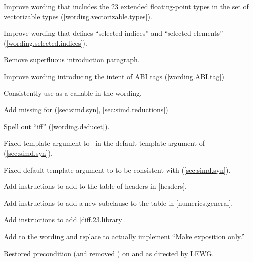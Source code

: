 \begin{revision}
\item Improve wording that includes the \CC{}23 extended floating-point types in the set of vectorizable types (\ref{wording.vectorizable.types}).
\item Improve wording that defines “selected indices” and “selected elements” (\ref{wording.selected.indices}).
\item Remove superfluous introduction paragraph.
\item Improve wording introducing the intent of ABI tags (\ref{wording.ABI.tag})
\item Consistently use  as a callable in the wording.
\item Add missing  for  (\ref{sec:simd.syn}, \ref{sec:simd.reductions}).
\item Spell out “iff” (\ref{wording.deducet}).
\item Fixed template argument to \nativeabi\ in the default template argument of  (\ref{sec:simd.syn}).
\item Fixed default template argument to  to be consistent with  (\ref{sec:simd.syn}).
\item Add instructions to add  to the table of headers in [headers].
\item Add instructions to add a new subclause to the table in [numerics.general].
\item Add instructions to add  [diff.23.library].
\item Add \simdsizev to the wording and replace  to actually implement “Make  exposition only.”
\item Restored precondition (and removed ) on
   and  as directed by LEWG.
\end{revision}

